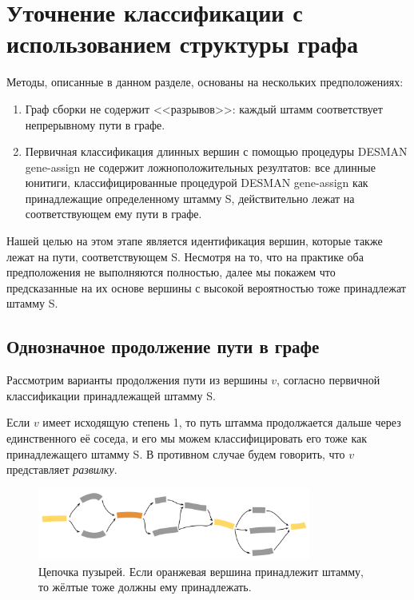 \documentclass{spbau-diploma}
\begin{document}
\section{Уточнение классификации с использованием структуры графа}

Методы, описанные в данном разделе, основаны на нескольких предположениях: 
\begin{enumerate}
    \item Граф сборки не содержит <<разрывов>>: каждый штамм соответствует непрерывному пути в графе.
    \item Первичная классификация длинных вершин с помощью процедуры DESMAN gene-assign не содержит ложноположительных резултатов: все длинные юнитиги, классифицированные процедурой DESMAN gene-assign как принадлежащие определенному штамму S, действительно лежат на соответствующем ему пути в графе. 
\end{enumerate}

Нашей целью на этом этапе является идентификация вершин, которые также лежат на пути, соответствующем S. Несмотря на то, что на практике оба предположения не выполняются полностью, далее мы покажем что предсказанные на их основе вершины с высокой вероятностью тоже принадлежат штамму S.

\subsection{Однозначное продолжение пути в графе}

Рассмотрим варианты продолжения пути из вершины $v$, согласно первичной классификации принадлежащей штамму S.

Если $v$ имеет исходящую степень 1, то путь штамма продолжается дальше через единственного её соседа, и его мы можем классифицировать его тоже как принадлежащего штамму S.
В противном случае будем говорить, что $v$ представляет \textit{развилку}.


\begin{figure}[b]
\centering
\includegraphics[width=0.8\textwidth]{pics/bubbles_chain.png}
\caption{Цепочка пузырей. Если оранжевая вершина принадлежит штамму, то жёлтые тоже должны ему принадлежать.}
\label{bubbles_chain}
\end{figure}
\end{document}
